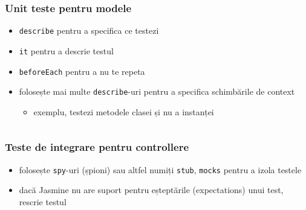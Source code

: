 \documentclass[compress]{beamer}
\begin{document}
\begin{frame}

\frametitle{Unit teste pentru modele}

\begin{itemize}[<+->]
  \item \texttt{describe} pentru a specifica ce testezi
  \item \texttt{it} pentru a descrie testul
  \item \texttt{beforeEach} pentru a nu te repeta
  \item folosește mai multe \texttt{describe}-uri pentru a specifica schimbările de context
  \begin{itemize}[<+->]
    \item exemplu, testezi metodele clasei și nu a instanței
  \end{itemize}
\end{itemize}

\inputminted[fontsize=\tiny,gobble=2,linenos=true,firstline=3,lastline=23]{javascript}{code/js/app/test/model/article.js}

\end{frame}

\begin{frame}

\frametitle{Teste de integrare pentru controllere}

\begin{itemize}[<+->]
  \item folosește \texttt{spy}-uri (șpioni) sau altfel numiți \texttt{stub}, \texttt{mocks} pentru a izola testele
  \item dacă Jasmine nu are suport pentru eșteptările (expectations) unui test, rescrie testul
\end{itemize}

\inputminted[fontsize=\tiny,gobble=2,linenos=true,firstline=6,lastline=29]{javascript}{code/js/app/test/controller/publish.js}

\end{frame}
\end{document}
